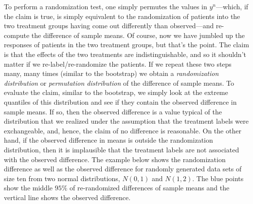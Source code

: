 \documentclass[
]{book}
\theoremstyle{definition}
\theoremstyle{definition}
\theoremstyle{definition}
\theoremstyle{definition}
\theoremstyle{remark}
\begin{document}
To perform a randomization test, one simply permutes the values in \(y^n\)---which, if the claim is true, is simply equivalent to the randomization of patients into the two treatment groups having come out differently than observed---and re-compute the difference of sample means. Of course, now we have jumbled up the responses of patients in the two treatment groups, but that's the point. The claim is that the effects of the two treatments are indistinguishable, and so it shouldn't matter if we re-label/re-randomize the patients. If we repeat these two steps many, many times (similar to the bootstrap) we obtain a \emph{randomization distribution} or \emph{permutation distribution} of the difference of sample means. To evaluate the claim, similar to the bootstrap, we simply look at the extreme quantiles of this distribution and see if they contain the observed difference in sample means. If so, then the observed difference is a value typical of the distribution that we realized under the assumption that the treatment labels were exchangeable, and, hence, the claim of no difference is reasonable. On the other hand, if the observed difference in means is outside the randomization distribution, then it is implausible that the treatment labels are not associated with the observed difference. The example below shows the randomization difference as well as the observed difference for randomly generated data sets of size ten from two normal distributions, \(N(0,1)\) and \(N(1,2)\). The blue points show the middle \(95\%\) of re-randomized differences of sample means and the vertical line shows the observed difference.
\end{document}
